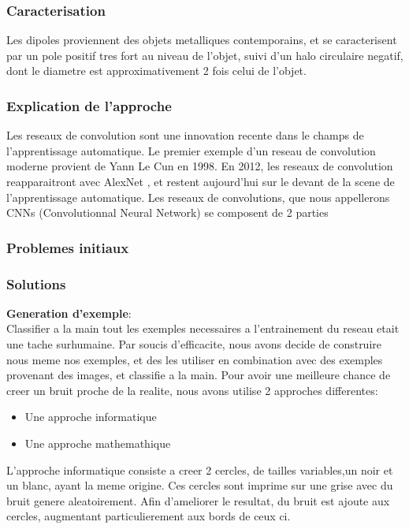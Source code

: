 \documentclass[a4paper, 12pt, titlepage, oneside]{article}
\begin{document}
	\subsubsection{Caracterisation}
	Les dipoles proviennent des objets metalliques contemporains, et se caracterisent par un pole positif tres fort au niveau de l'objet, suivi d'un halo circulaire negatif, dont le diametre est approximativement 2 fois celui de l'objet.
	\subsubsection{Explication de l'approche}
	Les reseaux de convolution sont une innovation recente dans le champs de l'apprentissage automatique. Le premier exemple d'un reseau de convolution moderne provient de Yann Le Cun \cite{lecun-01a} en 1998. En 2012, les reseaux de convolution reapparaitront avec AlexNet \cite{NIPS2012_4824}, et restent aujourd'hui sur le devant de la scene de l'apprentissage automatique. 
	Les reseaux de convolutions, que nous appellerons CNNs (Convolutionnal Neural Network) se composent de 2 parties
	\subsubsection{Problemes initiaux}
	\subsubsection{Solutions}
	\textbf{Generation d'exemple}:\\
	Classifier a la main tout les exemples necessaires a l'entrainement du reseau etait une tache surhumaine. Par soucis d'efficacite, nous avons decide de construire nous meme
	nos exemples, et des les utiliser en combination avec des exemples provenant des images, et classifie a la main.
	Pour avoir une meilleure chance de creer un bruit proche de la realite, nous avons utilise 2 approches differentes:
	\begin{itemize}
		\item Une approche informatique
		\item Une approche mathemathique
	\end{itemize}
	L'approche informatique consiste a creer 2 cercles, de tailles variables,un noir et un blanc, ayant la meme origine. Ces cercles sont imprime sur une  grise
	avec du bruit genere aleatoirement. Afin d'ameliorer le resultat, du bruit est ajoute aux cercles, augmentant particulierement aux bords de ceux ci.
		
\end{document}
